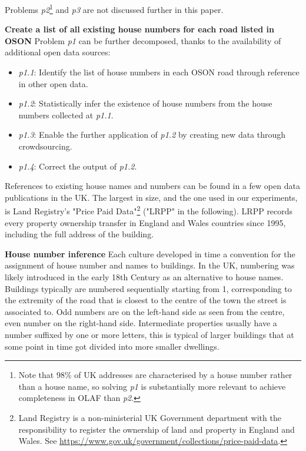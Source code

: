 Problems {\it p2}\footnote{Note that 98\% of UK addresses are characterised by a house number rather than a house name, so solving {\it p1} is substantially more relevant to achieve completeness in OLAF than {\it p2}.} and {\it p3} are not discussed further in this paper. 

\textbf{Create a list of all existing house numbers for each road listed in OSON} Problem {\it p1} can be further decomposed, thanks to the availability of additional open data sources:
    
\begin{itemize}
    \item {\it p1.1}: Identify the list of house numbers in each OSON road through reference in other open data.
    \item {\it p1.2}: Statistically infer the existence of house numbers from the house numbers collected at {\it p1.1}.
    \item {\it p1.3}: Enable the further application of {\it p1.2} by creating new data through crowdsourcing.
    \item {\it p1.4}: Correct the output of {\it p1.2}.
\end{itemize}

References to existing house names and numbers can be found in a few open data publications in the UK. The largest in size, and the one used in our experiments, is Land Registry's "Price Paid Data"\footnote{Land Registry is a non-ministerial UK Government department with the responsibility to register the ownership of land and property in England and Wales. See \url{https://www.gov.uk/government/collections/price-paid-data}.} ("LRPP" in the following). LRPP records every property ownership transfer in England and Wales countries since 1995, including the full address of the building.

\textbf{House number inference} Each culture developed in time a convention for the assignment of house number and names to buildings. In the UK, numbering was likely introduced in the early 18th Century as an alternative to house names. Buildings typically are numbered sequentially starting from 1, corresponding to the extremity of the road that is closest to the centre of the town the street is associated to. Odd numbers are on the left-hand side as seen from the centre, even number on the right-hand side. Intermediate properties usually have a number suffixed by one or more letters, this is typical of larger buildings that at some point in time got divided into more smaller dwellings. 
        
